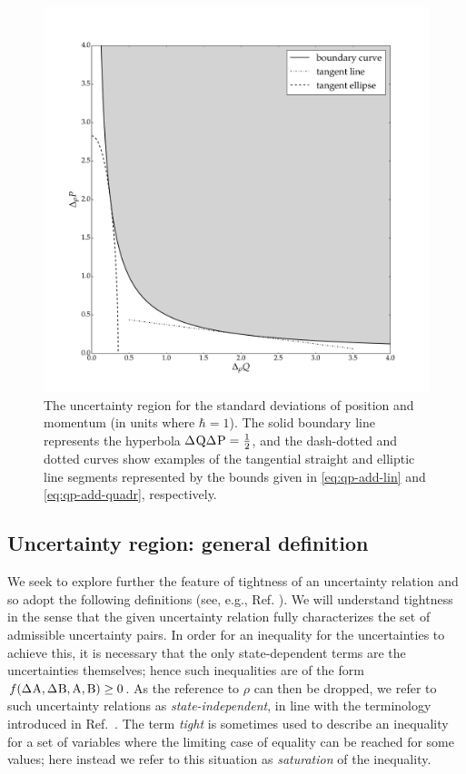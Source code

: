   \begin{figure}[ht]
    \includegraphics[width=\textwidth]{figs/qp-error-region}
    \caption[The uncertainty region for the standard deviations of position and momentum.]{The uncertainty region for the standard deviations of position and momentum (in units where $\hbar = 1$). The solid boundary line represents the hyperbola $\sdev{\opq}\sdev{\opp}=\frac{1}{2}$, and the dash-dotted and dotted curves show examples of the tangential straight and elliptic line segments represented by the bounds given in \eqref{eq:qp-add-lin} and \eqref{eq:qp-add-quadr}, respectively.}\label{fig:QP-UR}
  \end{figure}


\subsection{Uncertainty region: general definition}\label{sec:pur-def}
We seek to explore further the feature of tightness of an uncertainty relation  and so adopt the following definitions (see, e.g., Ref. \cite{AbbottAlzieuHallBranciard2016}).
We will understand tightness in the sense that the given uncertainty relation fully characterizes the set of admissible uncertainty pairs. In order for an inequality for the uncertainties to achieve this, it is necessary that the only state-dependent terms are the uncertainties themselves; hence such inequalities are of the form $f(\sdev{\opa},\sdev{\opb}, \opa,\opb)\ge 0$. As the reference to $\rho$ can then be dropped, we refer to such uncertainty relations as {\em state-independent}, in line with the terminology introduced in  Ref.~\cite{AbbottAlzieuHallBranciard2016}.
The term {\em tight} is sometimes used to describe an inequality for a set of variables where the limiting case of equality can be reached for some values; here instead we refer to this situation as {\em saturation} of the inequality. 

